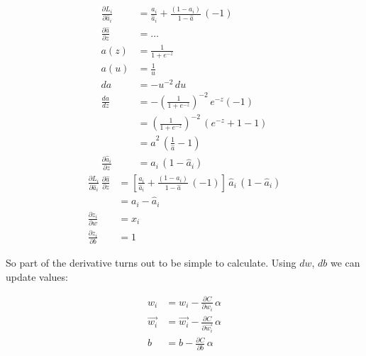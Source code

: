 \begin{align*}
  \frac{\partial L_i}{\partial \hat{a}_i} &= \frac{a_i}{\hat{a}_i} + \frac{(1-a_i)}{1-\hat{a}}\,(-1) \\
  \frac{\partial \hat{a}}{\partial z} &= \ldots  \label{eq:derZ}\\
  a(z)&= \frac{1}{1+e^{-z}}\\
  a(u)&=\frac{1}{u}\\
  da&=-u^{-2}\,du\\
  \frac{da}{dz}&=-\left(\frac{1}{1+e^{-z}}\right)^{-2}\,e^{-z}(-1)\\
  &=\left(\frac{1}{1+e^{-z}}\right)^{-2}\,(e^{-z} + 1 -1)\\
  &= \hat{a}^2\,(\frac{1}{\hat{a}} -1) \\
  \frac{\partial \hat{a}_i}{\partial z} &= \hat{a}_i\,(1-\hat{a}_i)
\end{align*}
\begin{align*}
  \frac{\partial L_i}{\partial \hat{a}_i}\,\frac{\partial \hat{a}}{\partial z} &= \left[ \frac{a_i}{\hat{a}_i} + \frac{(1-a_i)}{1-\hat{a}}\,(-1) \right]\,\hat{a}_i\,(1-\hat{a}_i)\\
  &= a_i - \hat{a}_i\\
  \frac{\partial z_i}{\partial w} &= x_i\\
  \frac{\partial z_i}{\partial b} &= 1
\end{align*}

So part of the derivative turns out to be simple to calculate. Using $dw$, $db$ we can update values:

\begin{align*}
  w_i &= w_i - \frac{\partial C}{\partial w_i}\,\alpha\\
  \vec{w_i} &= \vec{w_i} - \frac{\partial C}{\partial \vec{w_i}}\,\alpha\\
  b &= b - \frac{\partial C}{\partial b}\,\alpha
\end{align*}

